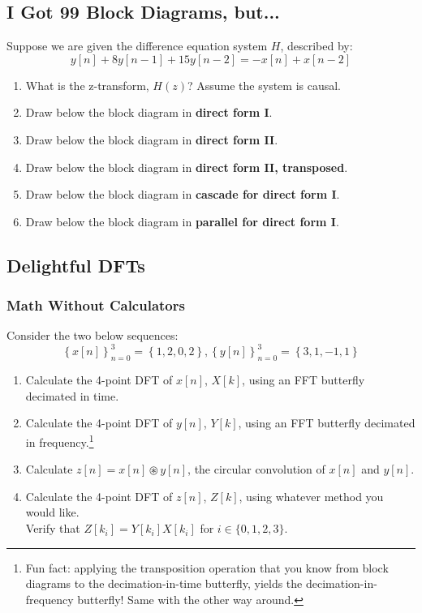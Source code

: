 \documentclass{article}
\begin{document}
\subsection{I Got 99 Block Diagrams, but...}
Suppose we are given the difference equation system $H$, described by: $$y[n] + 8y[n-1]+15y[n-2]=-x[n]+x[n-2]$$
\begin{enumerate}
    \item What is the z-transform, $H(z)$? Assume the system is causal. \vfill
    \item Draw below the block diagram in \textbf{direct form I}. \vfill
    \item Draw below the block diagram in \textbf{direct form II}.\vfill
    \item Draw below the block diagram in \textbf{direct form II, transposed}. \vfill
    \item Draw below the block diagram in \textbf{cascade for direct form I}.\vfill
    \item Draw below the block diagram in \textbf{parallel for direct form I}.\vfill
\end{enumerate}
\newpage
\subsection{Delightful DFTs}
\subsubsection{Math Without Calculators}
Consider the two below sequences:
\[
\left\{x[n]\right\}_{n=0}^{3} = \left\{ 1, 2, 0, 2 \right\}, 
\left\{y[n]\right\}_{n=0}^{3} = \left\{ 3, 1, -1, 1 \right\}
\]
\begin{enumerate}
    \item Calculate the 4-point DFT of $x[n]$, $X[k]$, using an FFT butterfly decimated in time. \vspace{4cm}
    \item Calculate the 4-point DFT of $y[n]$, $Y[k]$, using an FFT butterfly decimated in frequency.\footnote{Fun fact: applying the transposition operation that you know from block diagrams to the decimation-in-time butterfly, yields the decimation-in-frequency butterfly! Same with the other way around.} \vspace{4cm}
    \item Calculate $z[n] = x[n] \circledast y[n]$, the circular convolution of $x[n]$ and $y[n]$. \vspace{4cm}
    \item Calculate the 4-point DFT of $z[n]$, $Z[k]$, using whatever method you would like. \\ 
    Verify that $Z[k_i]=Y[k_i]X[k_i]$ for $i \in \{0, 1, 2, 3\}$.
    \vspace{4cm}

\end{enumerate}
\end{document}
